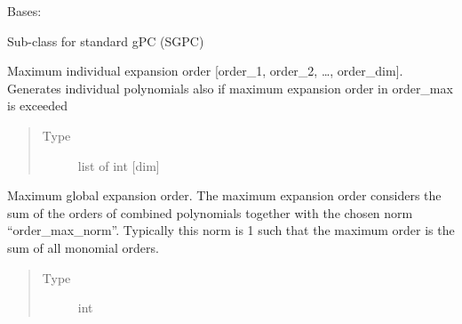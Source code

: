 \documentclass[letterpaper,10pt,english,openany,oneside]{sphinxmanual}
\begin{document}
\begin{fulllineitems}
\label{\detokenize{pygpc:pygpc.SGPC.SGPC}}
Bases: {\hyperref[\detokenize{pygpc:pygpc.GPC.GPC}]{}}

Sub-class for standard gPC (SGPC)

\begin{fulllineitems}
\label{\detokenize{pygpc:pygpc.SGPC.SGPC.order}}
Maximum individual expansion order {[}order\_1, order\_2, …, order\_dim{]}.
Generates individual polynomials also if maximum expansion order in order\_max is exceeded
\begin{quote}\begin{description}
\item[{Type}] \leavevmode
list of int {[}dim{]}

\end{description}\end{quote}

\end{fulllineitems}


\begin{fulllineitems}
\label{\detokenize{pygpc:pygpc.SGPC.SGPC.order_max}}
Maximum global expansion order.
The maximum expansion order considers the sum of the orders of combined polynomials together with the
chosen norm “order\_max\_norm”. Typically this norm is 1 such that the maximum order is the sum of all
monomial orders.
\begin{quote}\begin{description}
\item[{Type}] \leavevmode
int

\end{description}\end{quote}

\end{fulllineitems}


\end{fulllineitems}
\end{document}
